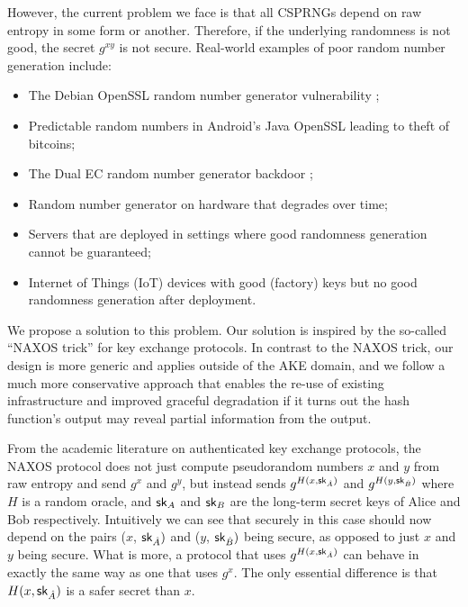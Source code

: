 \documentclass{article}
\begin{document}
However, the current problem we face is that all CSPRNGs depend on raw entropy in some form or another. Therefore, if the underlying randomness is not good, the secret $g^{xy}$ is not secure. Real-world examples of poor random number generation include:

\begin{itemize}
\item The Debian OpenSSL random number generator vulnerability \cite{DebianRNGflaw, DebianRNGflawTLSDHE};

\item Predictable random numbers in Android's Java OpenSSL \cite{MarvinGoogle2013} leading to theft of bitcoins;

\item The Dual EC random number generator backdoor \cite{DualECstandardisedbackdoor};

\item Random number generator on hardware that degrades over time;

\item Servers that are deployed in settings where good randomness generation cannot be guaranteed;

\item Internet of Things (IoT) devices with good (factory) keys but no good randomness generation after deployment.
\end{itemize}

We propose a solution to this problem. Our solution is inspired by the
so-called ``NAXOS trick'' for key exchange protocols. In contrast to the
NAXOS trick, our design is more generic and applies outside of the AKE
domain, and we follow a much more conservative approach that enables the
re-use of existing infrastructure and improved graceful degradation if
it turns out the hash function's output may reveal partial information
from the output.

From the academic literature on authenticated key exchange protocols, the NAXOS protocol \cite{LaMacchiaeCK2007} does not just compute pseudorandom numbers $x$ and $y$ from raw entropy and send $g^{x}$ and $g^{y}$, but instead sends $g^{H(x, \mathsf{sk}_{\hat A})}$ and $g^{H(y, \mathsf{sk}_{\hat B})}$ where $H$ is a random oracle, and $\mathsf{sk}_{A}$ and $\mathsf{sk}_{B}$ are the long-term secret keys of Alice and Bob respectively. Intuitively we can see that securely in this case should now depend on the pairs ($x$, $\mathsf{sk}_{\hat A})$ and ($y$, $\mathsf{sk}_{\hat B})$ being secure, as opposed to just $x$ and $y$ being secure. What is more, a protocol that uses $g^{H(x, \mathsf{sk}_{\hat A})}$ can behave in exactly the same way as one that uses $g^x$. The only essential difference is that $H(x, \mathsf{sk}_{\hat A})$ is a safer secret than $x$.
\end{document}
